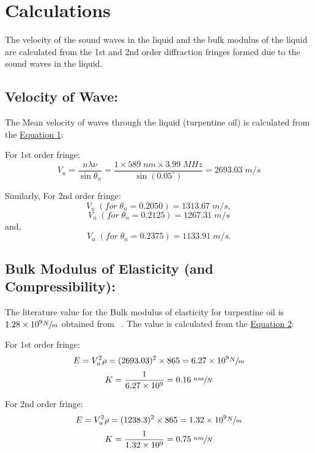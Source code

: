 \section{Calculations}

	The velocity of the sound waves in the liquid and the bulk modulus of the liquid are calculated from the 1st and 2nd order diffraction fringes formed due to the sound waves in the liquid.

	\subsection{Velocity of Wave:}
	The Mean velocity of waves through the liquid (turpentine oil) is calculated from the \hyperref[eqn:1]{Equation 1}:
	
	For 1st order fringe:
	$$
	V_u = \frac{n\lambda\nu}{\sin\theta_n}
	    = \frac{1\times 589\;nm \times 3.99\;MHz}{\sin (0.05^{\circ})}
		= 2693.03\;m/s
	$$
	
	Similarly, For 2nd order fringe:
	$$V_u\;(for\;\theta_n=0.2050) = 1313.67\;m/s,$$
	\vspace{-5.25mm}
	$$V_u\;(for\;\theta_n=0.2125) = 1267.31\;m/s$$
	\vspace{-5.25mm}
	\hspace{1.7cm}and,
	$$V_u\;(for\;\theta_n=0.2375) = 1133.91\;m/s.$$


	\subsection{Bulk Modulus of Elasticity (and Compressibility):}
	The literature value for the Bulk modulus of elasticity for turpentine oil is $1.28\times 10^9\sfrac{N}{m}$ obtained from ~\cite{bulkmodulus}. The value is calculated from the \hyperref[eqn:2]{Equation 2}:

	For 1st order fringe:
	$$E = V_u^2\rho = (2693.03)^2\times865 =6.27\times 10^9\sfrac{N}{m}$$
	$$K = \frac{1}{6.27\times 10^9} = 0.16\;\sfrac{nm}{N}$$

	For 2nd order fringe:
	$$E = V_u^2\rho = (1238.3)^2\times865 = 1.32\times 10^9\sfrac{N}{m}$$
	$$K = \frac{1}{1.32\times 10^9} = 0.75\;\sfrac{nm}{N}$$
